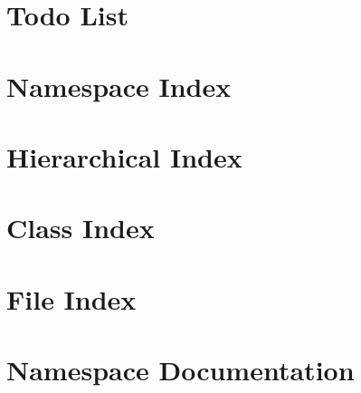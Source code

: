 \let\mypdfximage\pdfximage\def\pdfximage{\immediate\mypdfximage}\documentclass[twoside]{book}
\newcommand{\+}{\discretionary{\mbox{\scriptsize$\hookleftarrow$}}{}{}}
\begin{document}
\chapter{Todo List}
\label{todo}

\chapter{Namespace Index}

\chapter{Hierarchical Index}

\chapter{Class Index}

\chapter{File Index}

\chapter{Namespace Documentation}











\end{document}
